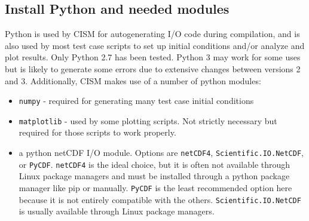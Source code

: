 \subsection{Install Python and needed modules}
Python is used by CISM for autogenerating I/O code during compilation, and is also
used by most test case scripts to set up initial conditions and/or analyze and plot
results.  Only Python 2.7 has been tested.  Python 3 may work for some uses but is
likely to generate some errors due to extensive changes between versions 2 and 3.
Additionally, CISM makes use of a number of python modules:
\begin{itemize}
  \item \texttt{numpy} - required for generating many test case initial conditions
  \item \texttt{matplotlib} - used by some plotting scripts.  Not strictly necessary but required for those scripts to work properly.
  \item  a python netCDF I/O module.  Options are \texttt{netCDF4},  \texttt{Scientific.IO.NetCDF}, or \texttt{PyCDF}.  
\texttt{netCDF4} is the ideal choice, but it is often not available through Linux package managers and must be installed through a python package manager like pip or manually.
\texttt{PyCDF} is the least recommended option here because it is not entirely compatible with the others.  \texttt{Scientific.IO.NetCDF} is usually available through Linux package managers.
\end{itemize}


